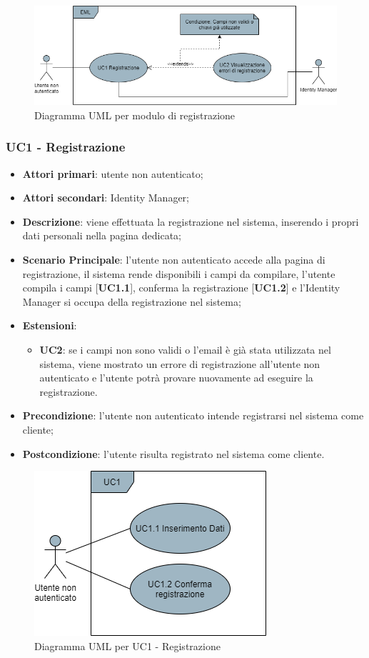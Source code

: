 \begin{figure}[H]
\centering
\includegraphics[scale=0.6]{res/UseCase/Immagini/RegistrazioneGenerale}
\caption{Diagramma UML per modulo di registrazione}
\end{figure}

\subsubsection{UC1 - Registrazione}
\begin{itemize}
\item \textbf{Attori primari}: utente non autenticato;
\item \textbf{Attori secondari}: Identity Manager;
\item \textbf{Descrizione}: viene effettuata la registrazione nel sistema, inserendo i propri dati personali nella pagina dedicata;
\item \textbf{Scenario Principale}: l'utente non autenticato accede alla pagina di registrazione, il sistema rende disponibili i campi da compilare, l'utente compila i campi [\textbf{UC1.1}], conferma la registrazione [\textbf{UC1.2}] e l'Identity Manager si occupa della registrazione nel sistema;
\item \textbf{Estensioni}:
\begin{itemize}
\item \textbf{UC2}: se i campi non sono validi o l'email è già stata utilizzata nel sistema, viene mostrato un errore di registrazione all'utente non autenticato e l'utente potrà provare nuovamente ad eseguire la registrazione.
\end{itemize}
\item \textbf{Precondizione}: l'utente non autenticato intende registrarsi nel sistema come cliente;
\item \textbf{Postcondizione}: l'utente risulta registrato nel sistema come cliente.
\end{itemize}

\begin{figure}[H]
\centering
\includegraphics[scale=0.6]{res/UseCase/Immagini/Registrazione}
\caption{Diagramma UML per UC1 - Registrazione}
\end{figure}

